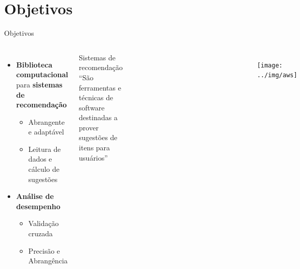 \section[Objetivos]{Objetivos}
\begin{frame}{Objetivos}
\begin{columns}[c] 
\begin{itemize}
	\item \textbf{Biblioteca computacional} para \textbf{sistemas de recomendação}
	\begin{itemize}
		\item Abrangente e adaptável
		\item Leitura de dados e cálculo de sugestões
	\end{itemize}
	\item \textbf{Análise de desempenho}
	\begin{itemize}
		\item Validação cruzada
		\item Precisão e Abrangência 
	\end{itemize}
\end{itemize}

\begin{block}{Sistemas de recomendação}
``São ferramentas e técnicas de software destinadas a prover sugestões de itens para usuários'' \cite{ricci2011introduction-chap1}
\end{block}

\begin{figure}[ht]
    \begin{center}
    \includegraphics[width=0.5\textwidth]{img/r}
    \end{center}
\end{figure}

\begin{figure}[ht]
    \begin{center}
    \includegraphics[width=1\textwidth]{img/movielens}
    \end{center}
\end{figure}

\begin{figure}[ht]
    \begin{center}
    \texttt{[image: ../img/aws]}
    \end{center}
\end{figure}

\end{columns}
\end{frame}
